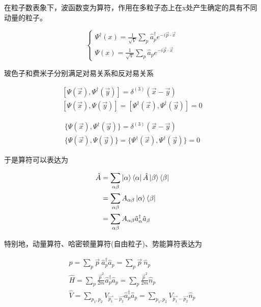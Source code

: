 在粒子数表象下，波函数变为算符，作用在多粒子态上在x处产生确定的具有不同动量的粒子。

\begin{equation}
	\left\{
	\begin{array}{lr}
		\Psi^\dagger(x)=\frac{1}{\sqrt{V}}\sum_{p}\hat{a}_p^\dagger e^{-i\vec{p}\cdot\vec{x}} \\
		\Psi(x)=\frac{1}{\sqrt{V}}\sum_{p}\hat{a}_pe^{-i\vec{p}\cdot\vec{x}}
	\end{array}
	\right.
\end{equation}

玻色子和费米子分别满足对易关系和反对易关系

\begin{equation}
	\begin{split}
		[\Psi(\vec{x}),\Psi^\dagger(\vec{y})]=\delta^{(3)}(\vec{x}-\vec{y}) \\
		[\Psi(\vec{x}),\Psi(\vec{y})]=[\Psi^\dagger(\vec{x}),\Psi^\dagger(\vec{y})]=0
	\end{split}
\end{equation}

\begin{equation}
	\begin{array}{lr}
		\{\Psi(\vec{x}),\Psi^\dagger(\vec{y})\}=\delta^{(3)}(\vec{x}-\vec{y}) \\
		\{\Psi(\vec{x}),\Psi(\vec{y})\}=\{\Psi^\dagger(\vec{x}),\Psi^\dagger(\vec{y})\}=0
	\end{array}
\end{equation}

于是算符可以表达为

\begin{equation}
	\begin{split}
		\hat{A} &= \sum_{\alpha\beta}\ket{\alpha}\bra{\alpha}\hat{A}\ket{\beta}\bra{\beta} \\
			&= \sum_{\alpha\beta}A_{\alpha\beta}\ket{\alpha}\bra{\beta} \\
			&= \sum_{\alpha\beta}A_{\alpha\beta}\hat{a}_\alpha^\dagger\hat{a}_\beta
	\end{split}
\end{equation}

特别地，动量算符、哈密顿量算符(自由粒子)、势能算符表达为

\begin{equation}
	\begin{array}{lr}
		\hat{p}= \sum_{p}\vec{p}\ \hat{a}_{p}^\dagger\hat{a}_{p}=\sum_{p}\vec{p}\ \hat{n}_{p}\\
		\hat{H}= \sum_{p}\frac{\vec{p}^2}{2m}\hat{a}_{p}^\dagger\hat{a}_{p}=\sum_{p}\frac{\vec{p}^2}{2m}\hat{n}_{p}\\
		\hat{V}= \sum_{p_{1},p_{2}}V_{\vec{p_{1}}-\vec{p_{2}}}\hat{a}_{p}^\dagger\hat{a}_{p}
           =\sum_{p_{1},p_{2}}V_{\vec{p_{1}}-\vec{p_{2}}}\hat{n}_{p}\\
	\end{array}
\end{equation}




